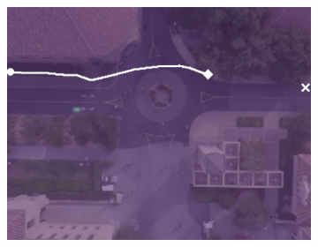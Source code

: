 \documentclass[usenames,dvipsnames]{article}
\begin{document}
\begin{enumerate}
\begin{item}
\begin{figure}[t!]
\begin{subfigure}[t]{0.5\textwidth}
\begin{minipage}[c]{0.3\linewidth}
		\includegraphics[width=\linewidth]{./figures/comparison/lstm_1_2_t=380.jpg}
	\end{minipage}
	

\end{subfigure}
\end{figure}
\end{item}
\end{enumerate}
\end{document}
